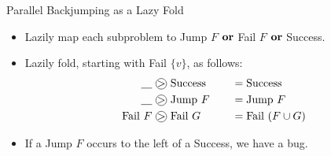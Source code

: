 \documentclass{beamer}
\newcommand*\circled[1]{\tikz[baseline=(char.base)]{
            \node[shape=circle,draw,inner sep=0pt] (char) {#1};}}
\begin{document}
\begin{frame}{Parallel Backjumping as a Lazy Fold}

     {
        \begin{itemize}
            \item Lazily map each subproblem to Jump $F$ $\KwSty{or}$ Fail $F$ $\KwSty{or}$ Success.
            \item Lazily fold, starting with Fail $\{ v \}$, as follows:
                \begin{alignat*}{2}
                    \underline{\hspace{1em}} &~\circled{$>$}~ \textnormal{Success} \hspace{1em} &&= \textnormal{Success} \\
                    \underline{\hspace{1em}} &~\circled{$>$}~ \textnormal{Jump}~F \hspace{1em} &&= \textnormal{Jump}~F \\
                    \textnormal{Fail}~F &~\circled{$>$}~ \textnormal{Fail}~G \hspace{1em} &&= \textnormal{Fail}~(F \cup G)
                \end{alignat*}
            \item If a Jump $F$ occurs to the left of a Success, we have a bug.
        \end{itemize}
    }


\end{frame}
\end{document}
